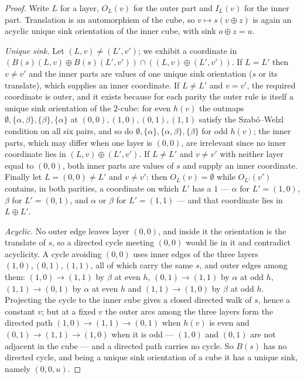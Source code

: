 \documentclass[11pt]{article}
\theoremstyle{plain}
\theoremstyle{definition}
\begin{document}
\begin{proof}
Write $L$ for a layer, $O_L(v)$ for the outer part and $I_L(v)$ for the
inner part. Translation is an automorphism of the cube, so
$v\mapsto s(v\oplus z)$ is again an acyclic unique sink orientation of the
inner cube, with sink $o\oplus z=u$.

\emph{Unique sink.} Let $(L,v)\ne(L',v')$; we exhibit a coordinate in
$(B(s)(L,v)\oplus B(s)(L',v'))\cap((L,v)\oplus(L',v'))$. If $L=L'$ then
$v\ne v'$ and the inner parts are values of one unique sink orientation
($s$ or its translate), which supplies an inner coordinate. If $L\ne L'$
and $v=v'$, the required coordinate is outer, and it exists because for
each parity the outer rule is itself a unique sink orientation of the
$2$-cube: for even $h(v)$ the outmaps $\emptyset,\{\alpha,\beta\},
\{\beta\},\{\alpha\}$ at $(0,0),(1,0),(0,1),(1,1)$ satisfy the
Szab\'o--Welzl condition on all six pairs, and so do
$\emptyset,\{\alpha\},\{\alpha,\beta\},\{\beta\}$ for odd $h(v)$; the
inner parts, which may differ when one layer is $(0,0)$, are irrelevant
since no inner coordinate lies in $(L,v)\oplus(L',v')$. If $L\ne L'$ and
$v\ne v'$ with neither layer equal to $(0,0)$, both inner parts are values
of $s$ and supply an inner coordinate. Finally let $L=(0,0)\ne L'$ and
$v\ne v'$: then $O_L(v)=\emptyset$ while $O_{L'}(v')$ contains, in both
parities, a coordinate on which $L'$ has a $1$ --- $\alpha$ for
$L'=(1,0)$, $\beta$ for $L'=(0,1)$, and $\alpha$ or $\beta$ for
$L'=(1,1)$ --- and that coordinate lies in $L\oplus L'$.

\emph{Acyclic.} No outer edge leaves layer $(0,0)$, and inside it the
orientation is the translate of $s$, so a directed cycle meeting $(0,0)$
would lie in it and contradict acyclicity. A cycle avoiding $(0,0)$ uses
inner edges of the three layers $(1,0),(0,1),(1,1)$, all of which carry
the same $s$, and outer edges among them: $(1,0)\to(1,1)$ by $\beta$ at
even $h$, $(0,1)\to(1,1)$ by $\alpha$ at odd $h$, $(1,1)\to(0,1)$ by
$\alpha$ at even $h$ and $(1,1)\to(1,0)$ by $\beta$ at odd $h$. Projecting
the cycle to the inner cube gives a closed directed walk of $s$, hence a
constant $v$; but at a fixed $v$ the outer arcs among the three layers
form the directed path $(1,0)\to(1,1)\to(0,1)$ when $h(v)$ is even and
$(0,1)\to(1,1)\to(1,0)$ when it is odd --- $(1,0)$ and $(0,1)$ are not
adjacent in the cube --- and a directed path carries no cycle. So $B(s)$
has no directed cycle, and being a unique sink
orientation of a cube it has a unique sink, namely $(0,0,u)$.


\end{proof}
\end{document}
